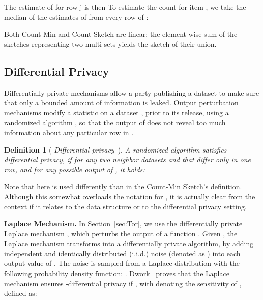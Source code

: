 \documentclass[conference]{IEEEtran}
\newcommand{\descr}[1]{\medskip \noindent \textbf{#1}}
\newtheorem{definition}{Definition}
\begin{document}
The estimate of  for row j is then 
To estimate the count  for item , we take the median of the estimates of  from every row of :\vspace{-0.1cm} 

Both Count-Min and Count Sketch are linear: the element-wise sum of the sketches representing two multi-sets yields the sketch of their union.











\subsection{Differential Privacy}
\label{sec:diffPrivacy}

Differentially private mechanisms allow a party publishing a dataset to make sure that only a bounded amount of information is leaked. Output perturbation mechanisms modify a statistic on a dataset , prior to its release, using a randomized algorithm , so that the output of  does not reveal too much information about any particular row in . 

\begin{definition}[{\em -Differential privacy}~\cite{dwork2006differential}]
A randomized algorithm  satisfies -differential privacy, if for any two neighbor datasets  and  that differ only in one row, and for any possible output  of , it holds: 

\end{definition}
Note that  here is used differently than in the Count-Min Sketch's definition. Although this somewhat overloads the notation for , it is actually clear from the context if it relates to the data structure or to the differential privacy setting.

\descr{Laplace Mechanism.} In Section~\ref{sec:Tor}, we use the differentially private Laplace mechanism \cite{dwork2006calibrating}, which perturbs the output of a function . Given , the Laplace mechanism transforms  into a differentially private algorithm, by adding independent and identically distributed (i.i.d.) noise (denoted as ) into each output value of . The noise  is sampled from a Laplace distribution  with the following probability density function: .
Dwork~\cite{dwork2006differential} proves that the Laplace mechanism ensures -differential privacy if , with   denoting the sensitivity of ,
defined as:\vspace{-0.1cm}
\end{document}
